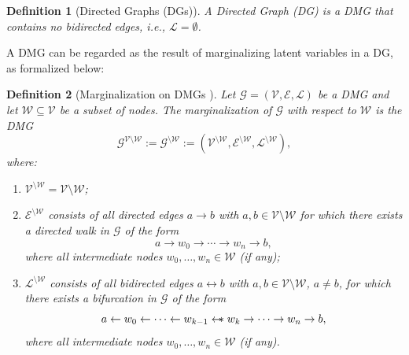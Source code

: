 \documentclass[accepted]{uai2025} %
\newtheorem{definition}{Definition}
\newcommand{\tuh}{\mathrel{\rightarrow}}
\newcommand{\hut}{\mathrel{\leftarrow}}
\newcommand{\huh}{\mathrel{\leftrightarrow}}
\newcommand{\hus}{\mathrel{{\leftarrow\mkern-11mu\ast}}}
\begin{document}
\begin{definition}[Directed Graphs (DGs)]
A \emph{Directed Graph (DG)} is a DMG that contains no bidirected edges, i.e., $\mathcal{L} = \emptyset$.
\end{definition}

A DMG can be regarded as the result of marginalizing latent variables in a DG, as formalized below:

\begin{definition}[Marginalization on DMGs \citep{BFPM21}]\label{margilization}
Let $\mathcal{G} = (\mathcal{V}, \mathcal{E}, \mathcal{L})$ be a DMG and let $\mathcal{W} \subseteq \mathcal{V}$ be a subset of nodes. The \emph{marginalization} of $\mathcal{G}$ with respect to $\mathcal{W}$ is the DMG
\[
\mathcal{G}^{\mathcal{V} \setminus \mathcal{W}} := \mathcal{G}^{\setminus \mathcal{W}} := (\mathcal{V}^{\setminus \mathcal{W}}, \mathcal{E}^{\setminus \mathcal{W}}, \mathcal{L}^{\setminus \mathcal{W}}),
\]
where:
\begin{enumerate}
    \item $\mathcal{V}^{\setminus \mathcal{W}} = \mathcal{V} \setminus \mathcal{W}$;
    \item $\mathcal{E}^{\setminus \mathcal{W}}$ consists of all directed edges $a \tuh b$ with $a, b \in \mathcal{V} \setminus \mathcal{W}$ for which there exists a directed walk in $\mathcal{G}$ of the form
    \[
    a \tuh w_0 \tuh \cdots \tuh w_n \tuh b,
    \]
    where all intermediate nodes $w_0, \ldots, w_n \in \mathcal{W}$ (if any);
    \item $\mathcal{L}^{\setminus \mathcal{W}}$ consists of all bidirected edges $a \huh b$ with $a, b \in \mathcal{V} \setminus \mathcal{W}$, $a \neq b$, for which there exists a bifurcation in $\mathcal{G}$ of the form
    \[
    a \hut w_0 \hut \cdots \hut w_{k-1} \hus w_k \tuh \cdots \tuh w_n \tuh b,
    \]
    where all intermediate nodes $w_0, \ldots, w_n \in \mathcal{W}$ (if any).
\end{enumerate}
\end{definition}
\end{document}
